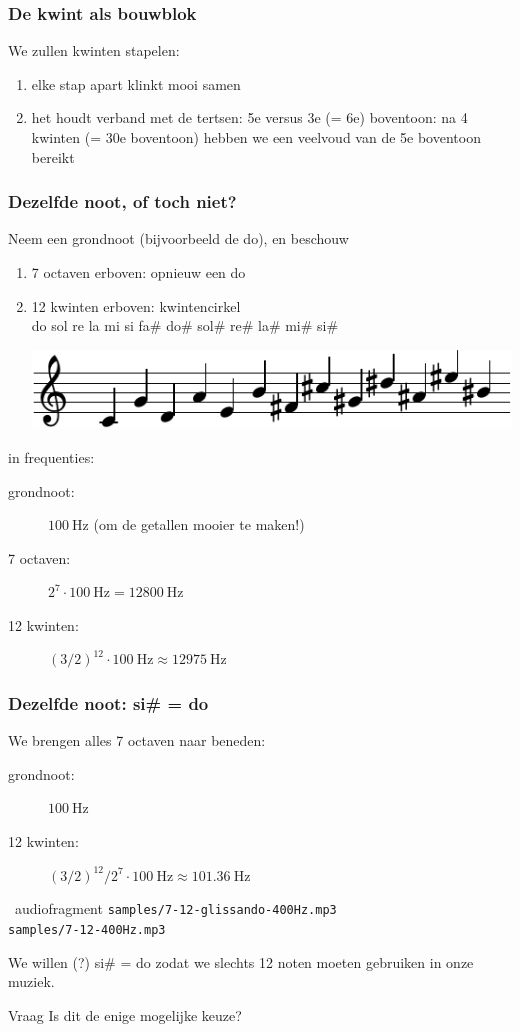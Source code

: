 \documentclass[compress, darktitle, framenumber, totalframenumber, handout]{beamer}
\begin{document}
\begin{frame}
  \frametitle{De kwint als bouwblok}

  We zullen kwinten stapelen:
  \begin{enumerate}
    \item elke stap apart klinkt mooi samen
    \item het houdt verband met de tertsen: 5e versus 3e (= 6e) boventoon: na 4 kwinten (= 30e boventoon) hebben we een veelvoud van de 5e boventoon bereikt
  \end{enumerate}
\end{frame}

\begin{frame}
  \frametitle{Dezelfde noot, of toch niet?}

  Neem een grondnoot (bijvoorbeeld de do), en beschouw
  \begin{enumerate}
    \item 7 octaven erboven: opnieuw een do
      \pause
    \item 12 kwinten erboven: \alert{kwintencirkel} \\
      do sol re la mi si fa\# do\# sol\# re\# la\# mi\# si\#

      \includegraphics{scores/circle-cropped}
  \end{enumerate}
  \pause
  in frequenties:
  \begin{description}
    \item[grondnoot:] $\SI{100}{\hertz}$ (om de getallen mooier te maken!)
    \item[7 octaven:] $2^7\cdot\SI{100}{\hertz}=\SI{12800}{\hertz}$ 
      \pause
    \item[12 kwinten:] $(3/2)^{12}\cdot\SI{100}{\hertz}\approx\SI{12975}{\hertz}$
  \end{description}
\end{frame}

\begin{frame}
  \frametitle{Dezelfde noot: si\# = do}

  We brengen alles 7 octaven naar beneden:
  \begin{description}
    \item[grondnoot:] $\SI{100}{\hertz}$
    \item[12 kwinten:] $(3/2)^{12}/2^7\cdot\SI{100}{\hertz}\approx\SI{101.36}{\hertz}$
  \end{description}
  \pause
  \begin{block}{\twonotes\ audiofragment}
    \texttt{samples/7-12-glissando-400Hz.mp3} \\
    \texttt{samples/7-12-400Hz.mp3}
  \end{block}
  \pause
  We willen (?) si\# = do zodat we slechts 12 noten moeten gebruiken in onze muziek.

  \begin{alertblock}{Vraag}
    Is dit de enige mogelijke keuze?
  \end{alertblock}
\end{frame}
\end{document}
